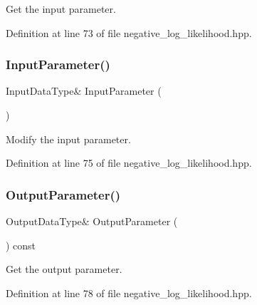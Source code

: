 Get the input parameter. 



Definition at line 73 of file negative\+\_\+log\+\_\+likelihood.\+hpp.

\mbox{\label{classmlpack_1_1ann_1_1NegativeLogLikelihood_a063c3b1053c7979a7dd2e7bbd2bf1f8a}} 
\subsubsection{Input\+Parameter()\hspace{0.1cm}{\footnotesize\ttfamily [2/2]}}
{\footnotesize\ttfamily Input\+Data\+Type\& Input\+Parameter (\begin{DoxyParamCaption}{ }\end{DoxyParamCaption})\hspace{0.3cm}{\ttfamily [inline]}}



Modify the input parameter. 



Definition at line 75 of file negative\+\_\+log\+\_\+likelihood.\+hpp.

\mbox{\label{classmlpack_1_1ann_1_1NegativeLogLikelihood_a8bae962cc603d1cab8d80ec78f8d505d}} 
\subsubsection{Output\+Parameter()\hspace{0.1cm}{\footnotesize\ttfamily [1/2]}}
{\footnotesize\ttfamily Output\+Data\+Type\& Output\+Parameter (\begin{DoxyParamCaption}{ }\end{DoxyParamCaption}) const\hspace{0.3cm}{\ttfamily [inline]}}



Get the output parameter. 



Definition at line 78 of file negative\+\_\+log\+\_\+likelihood.\+hpp.

